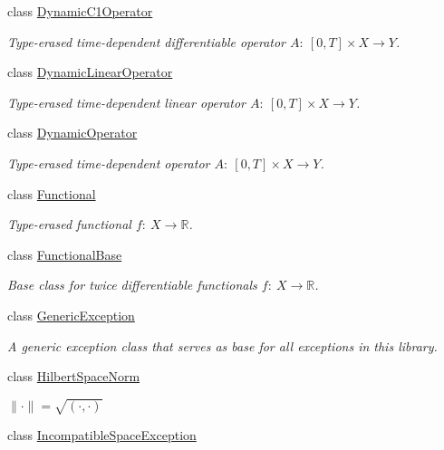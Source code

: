 \begin{DoxyCompactItemize}
class \hyperlink{classSpacy_1_1DynamicC1Operator}{Dynamic\+C1\+Operator}
\begin{DoxyCompactList}\small\item\em Type-\/erased time-\/dependent differentiable operator $A:\ [0,T] \times X \to Y $. \end{DoxyCompactList}\item 
class \hyperlink{classSpacy_1_1DynamicLinearOperator}{Dynamic\+Linear\+Operator}
\begin{DoxyCompactList}\small\item\em Type-\/erased time-\/dependent linear operator $A:\ [0,T] \times X \to Y $. \end{DoxyCompactList}\item 
class \hyperlink{classSpacy_1_1DynamicOperator}{Dynamic\+Operator}
\begin{DoxyCompactList}\small\item\em Type-\/erased time-\/dependent operator $A:\ [0,T] \times X \to Y $. \end{DoxyCompactList}\item 
class \hyperlink{classSpacy_1_1Functional}{Functional}
\begin{DoxyCompactList}\small\item\em Type-\/erased functional $f:\ X \to \mathbb{R} $. \end{DoxyCompactList}\item 
class \hyperlink{classSpacy_1_1FunctionalBase}{Functional\+Base}
\begin{DoxyCompactList}\small\item\em Base class for twice differentiable functionals $ f:\ X\rightarrow \mathbb{R}$. \end{DoxyCompactList}\item 
class \hyperlink{classSpacy_1_1GenericException}{Generic\+Exception}
\begin{DoxyCompactList}\small\item\em A generic exception class that serves as base for all exceptions in this library. \end{DoxyCompactList}\item 
class \hyperlink{classSpacy_1_1HilbertSpaceNorm}{Hilbert\+Space\+Norm}
\begin{DoxyCompactList}\small\item\em $ \|\cdot\|=\sqrt{(\cdot,\cdot)} $ \end{DoxyCompactList}\item 
class \hyperlink{classSpacy_1_1IncompatibleSpaceException}{Incompatible\+Space\+Exception}

\end{DoxyCompactItemize}
